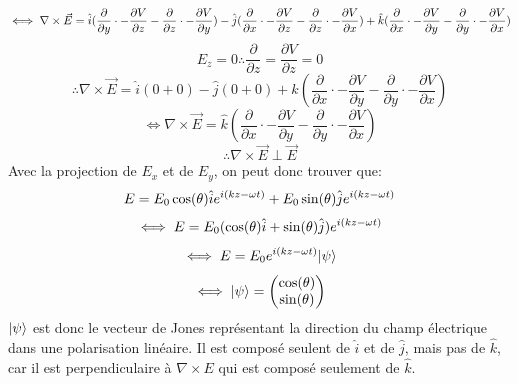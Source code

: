 \documentclass{article}
\begin{document}
$$
\iff \nabla \times \vec{E} = \hat{i}(\frac{\partial}{\partial y} \cdot -\frac{\partial V}{\partial z} - \frac{\partial}{\partial z} \cdot -\frac{\partial V}{\partial y}) \newline
- \hat{j}(\frac{\partial}{\partial x} \cdot -\frac{\partial V}{\partial z} - \frac{\partial}{\partial z} \cdot -\frac{\partial V}{\partial x}) \newline
+ \hat{k}(\frac{\partial}{\partial x} \cdot -\frac{\partial V}{\partial y} - \frac{\partial}{\partial y} \cdot -\frac{\partial V}{\partial x})
$$
$$
E_z = 0 \therefore \frac{\partial}{\partial z} = \frac{\partial V}{\partial z} = 0
$$
$$
\therefore \nabla \times \vec{E} = \hat{i}(0+0) - \hat{j}(0+0)
+ \hat{k}(\frac{\partial}{\partial x} \cdot -\frac{\partial V}{\partial y} - \frac{\partial}{\partial y} \cdot -\frac{\partial V}{\partial x})
$$
$$
\iff \nabla \times \vec{E} = \hat{k}(\frac{\partial}{\partial x} \cdot -\frac{\partial V}{\partial y} - \frac{\partial}{\partial y} \cdot -\frac{\partial V}{\partial x})
$$
$$
\therefore \nabla \times \vec{E} \perp \vec{E}
$$
Avec la projection de \( E_x \) et de \( E_y \), on peut donc trouver que:
$$
E = E_0 \cos(\theta) \hat{i} e^{i(kz-\omega t)} + E_0 \sin(\theta) \hat{j}
e^{i(kz-\omega t)} \\
$$
$$
\iff E = E_0 (\cos(\theta)\hat{i} + \sin(\theta)\hat{j}) e^{i(kz-\omega t)} \\
$$
$$
\iff E = E_0 e^{i(kz-\omega t)} \lvert\psi\rangle
$$
$$
\iff \lvert\psi\rangle = \begin{pmatrix} \cos(\theta) \\ \sin(\theta) \end{pmatrix}
$$
\( \lvert\psi\rangle \) est donc le vecteur de Jones représentant la direction du champ électrique dans
une polarisation linéaire. Il est composé seulent de \( \hat{i} \) et de \( \hat{j} \),
mais pas de \( \hat{k} \), car il est perpendiculaire à \( \nabla \times {E} \) qui est composé
seulement de \( \hat{k} \).
\end{document}
